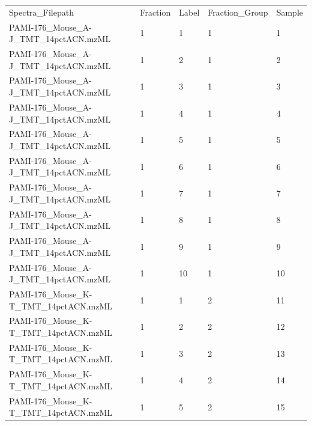 \begin{table}[!ht]
\centering
\small
\begin{tabular*}{0.95\textwidth}{lllll}
Spectra\_Filepath                         & Fraction           & Label                 & Fraction\_Group  & Sample    \\
PAMI-176\_Mouse\_A-J\_TMT\_14pctACN.mzML  & 1                  & 1                     & 1                & 1         \\
PAMI-176\_Mouse\_A-J\_TMT\_14pctACN.mzML  & 1                  & 2                     & 1                & 2         \\
PAMI-176\_Mouse\_A-J\_TMT\_14pctACN.mzML  & 1                  & 3                     & 1                & 3         \\
PAMI-176\_Mouse\_A-J\_TMT\_14pctACN.mzML  & 1                  & 4                     & 1                & 4         \\
PAMI-176\_Mouse\_A-J\_TMT\_14pctACN.mzML  & 1                  & 5                     & 1                & 5         \\
PAMI-176\_Mouse\_A-J\_TMT\_14pctACN.mzML  & 1                  & 6                     & 1                & 6         \\
PAMI-176\_Mouse\_A-J\_TMT\_14pctACN.mzML  & 1                  & 7                     & 1                & 7         \\
PAMI-176\_Mouse\_A-J\_TMT\_14pctACN.mzML  & 1                  & 8                     & 1                & 8         \\
PAMI-176\_Mouse\_A-J\_TMT\_14pctACN.mzML  & 1                  & 9                     & 1                & 9         \\
PAMI-176\_Mouse\_A-J\_TMT\_14pctACN.mzML  & 1                  & 10                    & 1                & 10        \\
PAMI-176\_Mouse\_K-T\_TMT\_14pctACN.mzML  & 1                  & 1                     & 2                & 11        \\
PAMI-176\_Mouse\_K-T\_TMT\_14pctACN.mzML  & 1                  & 2                     & 2                & 12        \\
PAMI-176\_Mouse\_K-T\_TMT\_14pctACN.mzML  & 1                  & 3                     & 2                & 13        \\
PAMI-176\_Mouse\_K-T\_TMT\_14pctACN.mzML  & 1                  & 4                     & 2                & 14        \\
PAMI-176\_Mouse\_K-T\_TMT\_14pctACN.mzML  & 1                  & 5                     & 2                & 15        \\

\end{tabular*}
\end{table}
